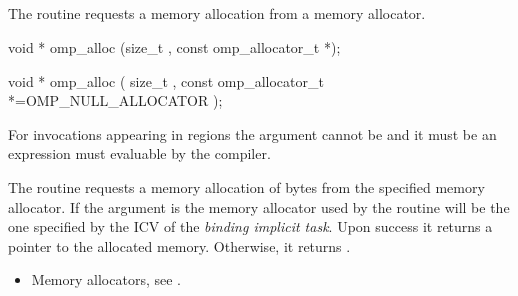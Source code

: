 \vspace{3\baselineskip}
\begin{ccppspecific}
\vspace{-3\baselineskip}
\subsection{}
\label{subsec:omp_alloc}

\summary
The  routine requests a memory allocation from a memory allocator.

\format
\begin{cspecific}
\begin{ompcFunction}
void * omp_alloc (size_t , const omp_allocator_t *);
\end{ompcFunction}
\end{cspecific}
\begin{cppspecific}
\begin{ompcFunction}
void * omp_alloc (
  size_t ,
  const omp_allocator_t *=OMP_NULL_ALLOCATOR
);
\end{ompcFunction}
\end{cppspecific}

\constraints

For  invocations appearing in  regions the  argument cannot be  and it must be an expression must evaluable by the compiler.

\effect

The  routine requests a memory allocation of  bytes from the specified memory allocator. If the  argument is
 the memory allocator used by the routine will be the one specified by the  ICV of the \emph{binding implicit task}.
Upon success it returns a pointer to the allocated memory. Otherwise, it returns .

\crossreferences
\begin{itemize}
\item Memory allocators, see .
\end{itemize}

\subsection{}
\label{subsec:omp_free}


\end{ccppspecific}
